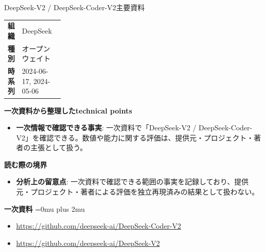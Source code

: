 \begin{technicalnote}{DeepSeek-V2 / DeepSeek-Coder-V2}{主要資料}
\begingroup
\begin{tabularx}{\linewidth}{@{}>{\bfseries}p{0.22\linewidth}X@{}}
組織 & DeepSeek \\
種別 & オープンウェイト \\
時系列 & 2024-06-17, 2024-05-06 \\
\end{tabularx}
\smallskip
{\bfseries 一次資料から整理したtechnical points}
\begin{itemize}[leftmargin=1.5em,itemsep=0.35em]
\item \textbf{一次情報で確認できる事実}: 一次資料で「DeepSeek-V2 / DeepSeek-Coder-V2」を確認できる。数値や能力に関する評価は、提供元・プロジェクト・著者の主張として扱う。
\end{itemize}
\begin{minipage}{\linewidth}
{\bfseries 読む際の境界}
\begin{itemize}[leftmargin=1.5em,itemsep=0.35em]
\item \textbf{分析上の留意点}: 一次資料で確認できる範囲の事実を記録しており、提供元・プロジェクト・著者による評価を独立再現済みの結果として扱わない。
\end{itemize}
\begin{samepage}
{\bfseries 一次資料}
\begingroup\sloppy
\Urlmuskip=0mu plus 2mu\relax
\begin{itemize}[leftmargin=1.5em,itemsep=0.25em]
\item {\scriptsize\url{https://github.com/deepseek-ai/DeepSeek-Coder-V2}}
\item {\scriptsize\url{https://github.com/deepseek-ai/DeepSeek-V2}}
\end{itemize}
\endgroup
\end{samepage}
\end{minipage}
\endgroup
\end{technicalnote}
\medskip

